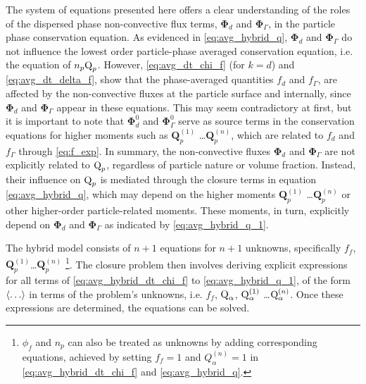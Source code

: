 The system of equations presented here offers a clear understanding of the roles of the dispersed phase non-convective flux terms, $\bm\Phi_d$ and $\bm\Phi_\Gamma$, in the particle phase conservation equation. 
As evidenced in \ref{eq:avg_hybrid_q}, $\bm{\Phi}_d$ and $\bm{\Phi}_\Gamma$  do not influence the lowest order particle-phase averaged conservation equation, i.e. the equation of $n_p \text Q_p$. 
However, \ref{eq:avg_dt_chi_f} (for $k = d$) and \ref{eq:avg_dt_delta_f}, show that the phase-averaged quantities $f_d$ and $f_\Gamma$, are affected by the non-convective fluxes at the particle surface and internally, since $\bm{\Phi}_d$ and $\bm{\Phi}_\Gamma$ appear in these equations.
This may seem contradictory at first, but it is important to note that $\bm{\Phi}_d^0$ and $\bm{\Phi}_\Gamma^0$ serve as source terms in the conservation equations for higher moments such as $\textbf{Q}^{(1)}_p$ \ldots $\textbf{Q}^{(n)}_p$, which are related to $f_d$ and $f_\Gamma$ through \ref{eq:f_exp}.
In summary, the non-convective fluxes $\bm{\Phi}_d$ and $\bm{\Phi}_\Gamma$  are not explicitly related to $\text Q_p$, regardless of particle nature or volume fraction. 
Instead, their influence on $\text Q_p$ is mediated through the closure terms in equation \ref{eq:avg_hybrid_q}, which may depend on the higher moments $\textbf{Q}^{(1)}_p$ \ldots $\textbf{Q}^{(n)}_p$ or other higher-order particle-related moments. %
These moments, in turn, explicitly depend on $\bm{\Phi}_d$ and $\bm{\Phi}_\Gamma$ as indicated by \ref{eq:avg_hybrid_q_1}. 

The hybrid model consists of $n+1$ equations for $n+1$ unknowns, specifically $f_f$, $\textbf{Q}_p^{(1)}$\ldots$\textbf{Q}_p^{(n)}$ \footnote{$\phi_f$ and $n_p$ can also be treated as unknowns by adding corresponding equations, achieved by setting $f_f=1$ and $Q_\alpha^{(n)} =1$ in \ref{eq:avg_hybrid_dt_chi_f} and \ref{eq:avg_hybrid_q}.}.
The closure problem then involves deriving explicit expressions for all terms of \ref{eq:avg_hybrid_dt_chi_f} to \ref{eq:avg_hybrid_q_1}, of the form $\left<\ldots\right>$ in terms of the problem's unknowns, i.e. 
$f_f$, $\text Q_\alpha$, $\text Q_\alpha^{(1)}$ \ldots $ \text Q_\alpha^{(n)}$.  
Once these expressions are determined, the equations can be solved. 


